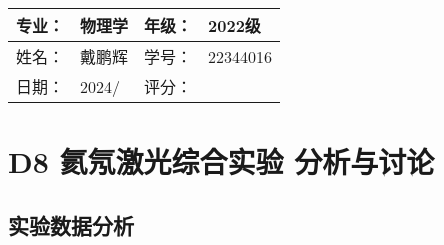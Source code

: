 \documentclass[dvipsnames, svgnames,a4paper,11pt]{article}
\begin{document}



	

\clearpage
\begin{table}
	\renewcommand\arraystretch{1.7}
	\begin{tabularx}{\textwidth}{|X|X|X|X|}
	\hline
	专业：& 物理学 &年级：& 2022级\\
	\hline
	姓名： & 戴鹏辉 & 学号：& 22344016\\
	\hline
    日期：& 2024/ & 评分： &\\
	\hline
	\end{tabularx}
\end{table}

\section{D8 \quad 氦氖激光综合实验 \quad\heiti 分析与讨论}

\subsection{实验数据分析}



		






		





\end{document}
